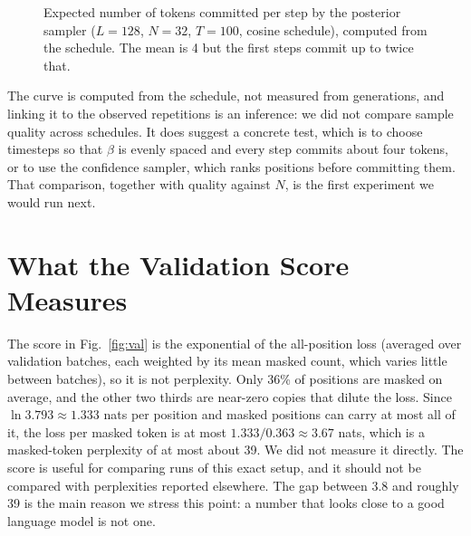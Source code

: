 \documentclass[conference]{IEEEtran}
\begin{document}
\begin{figure}[t]
\centering
{}
\caption{Expected number of tokens committed per step by the posterior sampler
($L{=}128$, $N{=}32$, $T{=}100$, cosine schedule), computed from the schedule.
The mean is 4 but the first steps commit up to twice that.}
\label{fig:commits}
\end{figure}

The curve is computed from the schedule, not measured from generations, and
linking it to the observed repetitions is an inference: we did not compare
sample quality across schedules. It does suggest a concrete test, which is to
choose timesteps so that $\beta$ is evenly spaced and every step commits about
four tokens, or to use the confidence sampler, which ranks positions before
committing them. That comparison, together with quality against $N$, is the
first experiment we would run next.

\section{What the Validation Score Measures}
\label{sec:metric}

The score in Fig.~\ref{fig:val} is the exponential of the all-position loss
(averaged over validation batches, each weighted by its mean masked count,
which varies little between batches), so it is not perplexity. Only 36\% of
positions are masked on average, and the other two thirds are near-zero copies
that dilute the loss. Since
$\ln 3.793\approx1.333$ nats per position and masked positions can carry at most
all of it, the loss per masked token is at most $1.333/0.363\approx3.67$ nats,
which is a masked-token perplexity of at most about 39. We did not measure it
directly. The score is useful for comparing runs of this exact setup, and it
should not be compared with perplexities reported elsewhere. The gap between
3.8 and roughly 39 is the main reason we stress this point: a number that looks
close to a good language model is not one.
\end{document}

